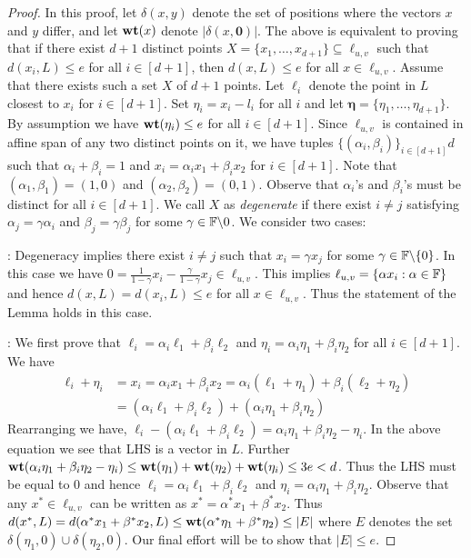 \begin{proof}
	In this proof, let $\delta(x,y)$ denote the set of positions where the vectors
	$x$ and $y$ differ, and let $\mathbf{wt}({x})$ denote $|\delta(x,\bm{0})|$. The above is equivalent to
	proving that if there exist $d+1$ distinct points $X =
	\{x_1,\ldots,x_{d+1}\}\subseteq \ell_{u,v}$ such
	that $d(x_i,L)\leq e$ for all $i\in [d+1]$, then $d(x,L)\leq e$ for all $x\in
	\ell_{u,v}$. Assume that there exists such a set $X$ of $d+1$ points. Let $\ell_i$ denote the point in $L$ closest to $x_i$ for $i\in
	[d+1]$. Set $\eta_i=x_i-l_i$ for all $i$ and let
	$\bm{\eta}=\{\eta_1,\ldots,\eta_{d+1}\}$. By assumption we have
	$\mathbf{wt}({\eta_i})\leq e$ for all $i\in [d+1]$. Since $\ell_{u,v}$ is contained in affine
	span of any two distinct points on it, we have tuples
	$\{(\alpha_i,\beta_i)\}_{i\in [d+1]}d$ such that $\alpha_i + \beta_i=1$ and $x_i=\alpha_ix_1 +
	\beta_ix_2$ for $i\in [d+1]$. Note that $(\alpha_1,\beta_1)=(1,0)$ and
	$(\alpha_2,\beta_2)=(0,1)$. Observe that $\alpha_i$'s and $\beta_i$'s must be
	distinct for all $i\in [d+1]$. We call $X$ as {\em degenerate} if there exist
	$i\neq j$ satisfying $\alpha_j=\gamma\alpha_i$ and $\beta_j=\gamma\beta_j$ for
	some $\gamma\in \mathbb{F}\backslash {0}$. We consider two cases:
	
	: Degeneracy implies there exist $i\neq j$ such that $x_i=\gamma x_j$ for
	some $\gamma\in \mathbb{F}\backslash\{0\}$. In this case we have $0 =
	\frac{1}{1-\gamma}x_i -\frac{\gamma}{1-\gamma}x_j\in \ell_{u,v}$. This implies
	$\ell_{u,v}=\{\alpha x_i: \alpha\in \mathbb{F}\}$
	and hence $d(x,L)=d(x_i,L)\leq e$ for all $x\in \ell_{u,v}$. Thus the statement
	of the Lemma holds in this case.\smallskip 
	
	: We first prove
	that $\ell_i=\alpha_i\ell_1+\beta_i\ell_2$ and
	$\eta_i=\alpha_i\eta_1+\beta_i\eta_2$ for
	all $i\in [d+1]$. We have
	\begin{align*}
		\ell_i+\eta_i& = x_i = \alpha_ix_1 + \beta_ix_2 = \alpha_i(\ell_1+\eta_1) + \beta_i(\ell_2 + \eta_2) \\
					 & = (\alpha_i\ell_1 + \beta_i\ell_2) + (\alpha_i\eta_1 + \beta_i\eta_2)
	\end{align*}
	Rearranging we have,
	$
	\ell_i - (\alpha_i\ell_1 + \beta_i\ell_2) = \alpha_i\eta_1 +
	\beta_i\eta_2 - \eta_i
	$.
	In the above equation we see that LHS is a vector in $L$. Further $\mathbf{wt}({\alpha_i\eta_1 + \beta_i\eta_2 - \eta_i})\leq \mathbf{wt}({\eta_1})+\mathbf{wt}({\eta_2})+\mathbf{wt}({\eta_i})\leq 3e < d$. Thus the LHS must be equal to $0$ and hence $\ell_i = \alpha_i\ell_1 + \beta_i\ell_2$ and $\eta_i=\alpha_i\eta_1+\beta_i\eta_2$. Observe that any $x^\ast\in \ell_{u,v}$ can
	be written as $x^\ast=\alpha^\ast x_1+\beta^\ast x_2$. Thus $d(x^\ast,L)=d(\alpha^\ast x_1+\beta^\ast x_2,L)\leq \mathbf{wt}({\alpha^\ast \eta_1+\beta^\ast \eta_2})\leq |E|$ where $E$ denotes the set $\delta(\eta_1,0)\cup \delta(\eta_2,0)$. Our final effort will be to show that $|E|\leq e$.
	

\end{proof}
